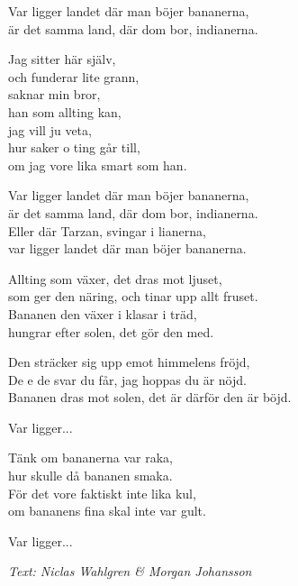 \vspace{10pt}
Var ligger landet där man böjer bananerna,\\
är det samma land, där dom bor, indianerna.\par
\vspace{8pt}
Jag sitter här själv,\\
och funderar lite grann,\\
saknar min bror,\\
han som allting kan,\\
jag vill ju veta,\\
hur saker o ting går till,\\
om jag vore lika smart som han.\par
\vspace{8pt}
Var ligger landet där man böjer bananerna,\\
är det samma land, där dom bor, indianerna.\\
Eller där Tarzan, svingar i lianerna,\\
var ligger landet där man böjer bananerna.\par
\vspace{8pt}
Allting som växer, det dras mot ljuset,\\
som ger den näring, och tinar upp allt fruset.\\
Bananen den växer i klasar i träd,\\
hungrar efter solen, det gör den med.\par
\vspace{8pt}
Den sträcker sig upp emot himmelens fröjd,\\
De e de svar du får, jag hoppas du är nöjd.\\
Bananen dras mot solen, det är därför den är böjd.\par
\vspace{8pt}
Var ligger...\par
\vspace{8pt}
Tänk om bananerna var raka,\\
hur skulle då bananen smaka.\\
För det vore faktiskt inte lika kul,\\
om bananens fina skal inte var gult.\par
\vspace{8pt}
Var ligger...\par
\vspace{10pt}
{\footnotesize\textit{Text: Niclas Wahlgren \& Morgan Johansson}}
